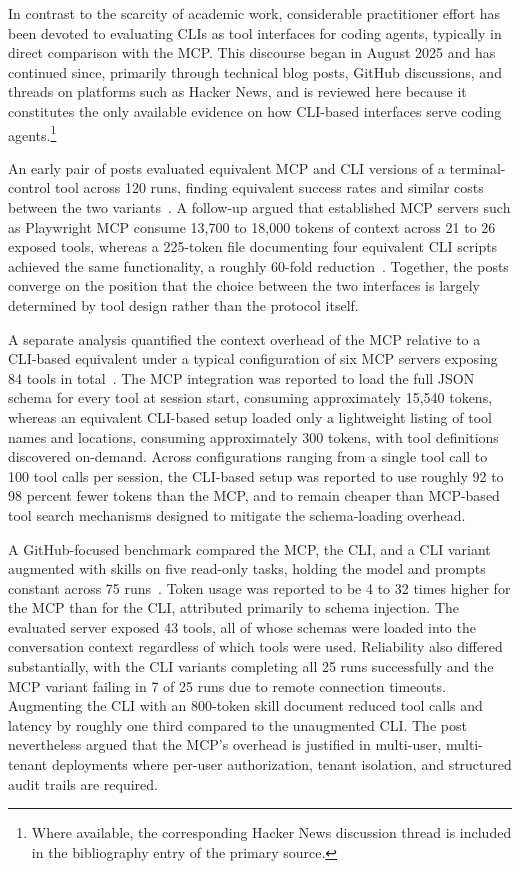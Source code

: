 \documentclass[
english,                 %
bibtex,                  %
]{kththesis}
\numberwithin{listing}{chapter}
\begin{document}
In contrast to the scarcity of academic work, considerable practitioner effort has been devoted to evaluating \glspl{CLI} as tool interfaces for coding agents, typically in direct comparison with the \gls{MCP}. This discourse began in August 2025 and has continued since, primarily through technical blog posts, GitHub discussions, and threads on platforms such as Hacker News, and is reviewed here because it constitutes the only available evidence on how \gls{CLI}-based interfaces serve coding agents.\footnote{Where available, the corresponding Hacker News discussion thread is included in the bibliography entry of the primary source.}

An early pair of posts evaluated equivalent \gls{MCP} and \gls{CLI} versions of a terminal-control tool across 120 runs, finding equivalent success rates and similar costs between the two variants~\cite{zechner_mcp_2025}. A follow-up argued that established \gls{MCP} servers such as Playwright \gls{MCP} consume 13,700 to 18,000 tokens of context across 21 to 26 exposed tools, whereas a 225-token file documenting four equivalent \gls{CLI} scripts achieved the same functionality, a roughly 60-fold reduction~\cite{zechner_what_2025}. Together, the posts converge on the position that the choice between the two interfaces is largely determined by tool design rather than the protocol itself.

A separate analysis quantified the context overhead of the \gls{MCP} relative to a \gls{CLI}-based equivalent under a typical configuration of six \gls{MCP} servers exposing 84 tools in total~\cite{yilmaz_i_2026}. The \gls{MCP} integration was reported to load the full \gls{JSON} schema for every tool at session start, consuming approximately 15,540 tokens, whereas an equivalent \gls{CLI}-based setup loaded only a lightweight listing of tool names and locations, consuming approximately 300 tokens, with tool definitions discovered on-demand. Across configurations ranging from a single tool call to 100 tool calls per session, the \gls{CLI}-based setup was reported to use roughly 92 to 98 percent fewer tokens than the \gls{MCP}, and to remain cheaper than \gls{MCP}-based tool search mechanisms designed to mitigate the schema-loading overhead.

A GitHub-focused benchmark compared the \gls{MCP}, the \gls{CLI}, and a \gls{CLI} variant augmented with skills on five read-only tasks, holding the model and prompts constant across 75 runs~\cite{madabhushi_mcp_2026}. Token usage was reported to be 4 to 32 times higher for the \gls{MCP} than for the \gls{CLI}, attributed primarily to schema injection. The evaluated server exposed 43 tools, all of whose schemas were loaded into the conversation context regardless of which tools were used. Reliability also differed substantially, with the \gls{CLI} variants completing all 25 runs successfully and the \gls{MCP} variant failing in 7 of 25 runs due to remote connection timeouts. Augmenting the \gls{CLI} with an 800-token skill document reduced tool calls and latency by roughly one third compared to the unaugmented \gls{CLI}. The post nevertheless argued that the \gls{MCP}'s overhead is justified in multi-user, multi-tenant deployments where per-user authorization, tenant isolation, and structured audit trails are required.
\end{document}
